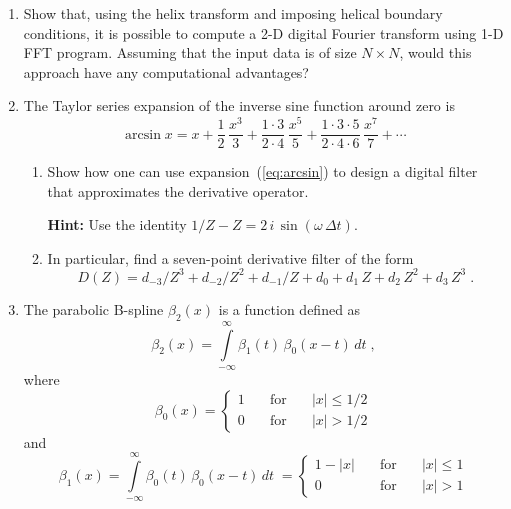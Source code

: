 \begin{enumerate}

\item Show that, using the helix transform and imposing helical boundary conditions, it is possible to compute a 2-D digital Fourier transform using 1-D FFT program. Assuming that the input data is of size $N \times N$, would this approach have any computational advantages?

\item The Taylor series expansion of the inverse sine function around zero is
\begin{equation}
  \label{eq:arcsin}
  \arcsin{x} = x + \frac{1}{2}\,\frac{x^3}{3} + 
  \frac{1 \cdot 3}{2 \cdot 4}\,\frac{x^5}{5} + 
  \frac{1 \cdot 3 \cdot 5}{2 \cdot 4 \cdot 6}\,\frac{x^7}{7} + 
  \cdots
\end{equation}
\begin{enumerate}
\item Show how one can use expansion~(\ref{eq:arcsin}) to design a
  digital filter that approximates the derivative
  operator. 

  \textbf{Hint:} Use the identity $1/Z-Z = 2\,i\,\sin(\omega\,\Delta t)$.
\item In particular, find a seven-point derivative filter of the form
\begin{equation}
  \label{eq:d6}
  D(Z) = d_{-3}/Z^{3} + d_{-2}/Z^{2} + d_{-1}/Z + d_0 + 
  d_1\,Z + d_2\,Z^2 + d_3\,Z^3\;.
\end{equation}
\end{enumerate}

\item The parabolic B-spline $\beta_2(x)$ is a function defined as
 \begin{equation}
   \label{eq:b3} 
   \beta_2(x) = \int\limits_{-\infty}^{\infty} \beta_1(t)\,\beta_0(x-t)\,d t\;,
\end{equation}
where
\begin{equation}
   \label{eq:b1}
   \beta_0(x) = \left\{\begin{array}{lcl} 1 & \quad\mbox{for}\quad & |x| \le 1/2 \\
       0 &\quad \mbox{for}\quad& |x| > 1/2\end{array}\right.
 \end{equation}
and
\begin{equation}
  \label{eq:b2} 
   \beta_1(x) = \int\limits_{-\infty}^{\infty} \beta_0(t)\,\beta_0(x-t)\,d t\;
   = \left\{\begin{array}{lcl} 1-|x| &\quad \mbox{for}\quad& |x| \le 1 \\
       0 & \quad \mbox{for}\quad&  |x| > 1\end{array}\right.
\end{equation}


\end{enumerate}
